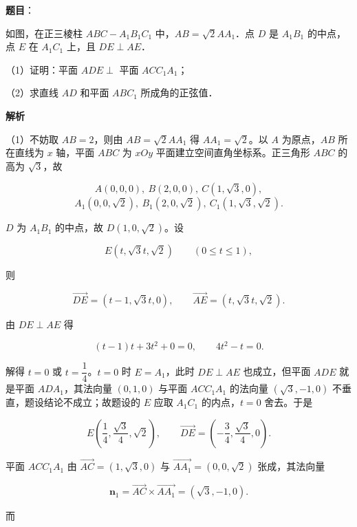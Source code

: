 \begin{answer}

\textbf{题目}：

如图，在正三棱柱 $ABC-A_1B_1C_1$ 中，$AB=\sqrt2 AA_1$．点 $D$ 是 $A_1B_1$ 的中点，点 $E$ 在 $A_1C_1$ 上，且 $DE\perp AE$．

（1）证明：平面 $ADE\perp$ 平面 $ACC_1A_1$；

（2）求直线 $AD$ 和平面 $ABC_1$ 所成角的正弦值．
\nopagebreak[4]
\begin{center}\end{center}
\nopagebreak[4]
\textbf{解析}

（1）不妨取 $AB=2$，则由 $AB=\sqrt2 AA_1$ 得 $AA_1=\sqrt2$。以 $A$ 为原点，$AB$ 所在直线为 $x$ 轴，平面 $ABC$ 为 $xOy$ 平面建立空间直角坐标系。正三角形 $ABC$ 的高为 $\sqrt3$，故

\nopagebreak[4]
\[A(0,0,0),\ B(2,0,0),\ C(1,\sqrt3,0),\]
\nopagebreak[4]
\[A_1(0,0,\sqrt2),\ B_1(2,0,\sqrt2),\ C_1(1,\sqrt3,\sqrt2).\]

$D$ 为 $A_1B_1$ 的中点，故 $D(1,0,\sqrt2)$。设

\nopagebreak[4]
\[E(t,\sqrt3t,\sqrt2)\qquad(0\leqslant t\leqslant1),\]

则

\nopagebreak[4]
\[\overrightarrow{DE}=(t-1,\sqrt3t,0),\qquad \overrightarrow{AE}=(t,\sqrt3t,\sqrt2).\]

由 $DE\perp AE$ 得

\nopagebreak[4]
\[(t-1)t+3t^2+0=0,\qquad 4t^2-t=0.\]

解得 $t=0$ 或 $t=\dfrac14$。$t=0$ 时 $E=A_1$，此时 $DE\perp AE$ 也成立，但平面 $ADE$ 就是平面 $ADA_1$，其法向量 $(0,1,0)$ 与平面 $ACC_1A_1$ 的法向量 $(\sqrt3,-1,0)$ 不垂直，题设结论不成立；故题设的 $E$ 应取 $A_1C_1$ 的内点，$t=0$ 舍去。于是

\nopagebreak[4]
\[E\left(\frac14,\frac{\sqrt3}4,\sqrt2\right),\qquad
\overrightarrow{DE}=\left(-\frac34,\frac{\sqrt3}4,0\right).\]

平面 $ACC_1A_1$ 由 $\overrightarrow{AC}=(1,\sqrt3,0)$ 与 $\overrightarrow{AA_1}=(0,0,\sqrt2)$ 张成，其法向量

\nopagebreak[4]
\[\boldsymbol n_1=\overrightarrow{AC}\times\overrightarrow{AA_1}=(\sqrt3,-1,0).\]

而


\end{answer}
